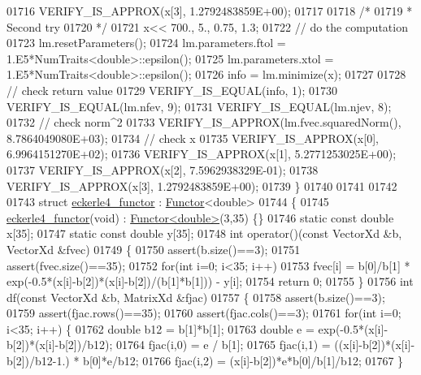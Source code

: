 \begin{DoxyCode}
01716   VERIFY\_IS\_APPROX(x[3], 1.2792483859E+00);
01717 
01718   \textcolor{comment}{/*}
01719 \textcolor{comment}{   * Second try}
01720 \textcolor{comment}{   */}
01721   x<< 700., 5., 0.75, 1.3;
01722   \textcolor{comment}{// do the computation}
01723   lm.resetParameters();
01724   lm.parameters.ftol = 1.E5*NumTraits<double>::epsilon();
01725   lm.parameters.xtol = 1.E5*NumTraits<double>::epsilon();
01726   info = lm.minimize(x);
01727 
01728   \textcolor{comment}{// check return value}
01729   VERIFY\_IS\_EQUAL(info, 1);
01730   VERIFY\_IS\_EQUAL(lm.nfev, 9);
01731   VERIFY\_IS\_EQUAL(lm.njev, 8);
01732   \textcolor{comment}{// check norm^2}
01733   VERIFY\_IS\_APPROX(lm.fvec.squaredNorm(), 8.7864049080E+03);
01734   \textcolor{comment}{// check x}
01735   VERIFY\_IS\_APPROX(x[0], 6.9964151270E+02);
01736   VERIFY\_IS\_APPROX(x[1], 5.2771253025E+00);
01737   VERIFY\_IS\_APPROX(x[2], 7.5962938329E-01);
01738   VERIFY\_IS\_APPROX(x[3], 1.2792483859E+00);
01739 \}
01740 
01741 
01742 
01743 \textcolor{keyword}{struct }\hyperlink{structeckerle4__functor}{eckerle4\_functor} : \hyperlink{struct_functor}{Functor}<double>
01744 \{
01745     \hyperlink{structeckerle4__functor}{eckerle4\_functor}(\textcolor{keywordtype}{void}) : \hyperlink{struct_functor}{Functor<double>}(3,35) \{\}
01746     \textcolor{keyword}{static} \textcolor{keyword}{const} \textcolor{keywordtype}{double} x[35];
01747     \textcolor{keyword}{static} \textcolor{keyword}{const} \textcolor{keywordtype}{double} y[35];
01748     \textcolor{keywordtype}{int} operator()(\textcolor{keyword}{const} VectorXd &b, VectorXd &fvec)
01749     \{
01750         assert(b.size()==3);
01751         assert(fvec.size()==35);
01752         \textcolor{keywordflow}{for}(\textcolor{keywordtype}{int} i=0; i<35; i++)
01753             fvec[i] = b[0]/b[1] * exp(-0.5*(x[i]-b[2])*(x[i]-b[2])/(b[1]*b[1])) - y[i];
01754         \textcolor{keywordflow}{return} 0;
01755     \}
01756     \textcolor{keywordtype}{int} df(\textcolor{keyword}{const} VectorXd &b, MatrixXd &fjac)
01757     \{
01758         assert(b.size()==3);
01759         assert(fjac.rows()==35);
01760         assert(fjac.cols()==3);
01761         \textcolor{keywordflow}{for}(\textcolor{keywordtype}{int} i=0; i<35; i++) \{
01762             \textcolor{keywordtype}{double} b12 = b[1]*b[1];
01763             \textcolor{keywordtype}{double} e = exp(-0.5*(x[i]-b[2])*(x[i]-b[2])/b12);
01764             fjac(i,0) = e / b[1];
01765             fjac(i,1) = ((x[i]-b[2])*(x[i]-b[2])/b12-1.) * b[0]*e/b12;
01766             fjac(i,2) = (x[i]-b[2])*e*b[0]/b[1]/b12;
01767         \}

\end{DoxyCode}
